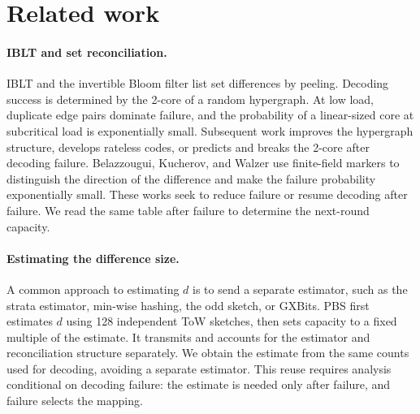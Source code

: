 \section{Related work}\label{sec:related}
\paragraph{IBLT and set reconciliation.} IBLT\cite{gm} and the invertible Bloom filter\cite{eppstein2011whatsdifference} list set differences by peeling. Decoding success is determined by the 2-core of a random hypergraph\cite{molloy,dw,dm}. At low load, duplicate edge pairs dominate failure\cite{gm,yw}, and the probability of a linear-sized core at subcritical load is exponentially small\cite{kim2008poisson,dn08}. Subsequent work improves the hypergraph structure\cite{lazaro2021irregular}, develops rateless codes\cite{yang2024rateless,lazaro2023ratecompatible}, or predicts and breaks the 2-core after decoding failure\cite{gadurek2026breaking}. Belazzougui, Kucherov, and Walzer\cite{belazzougui2024better} use finite-field markers to distinguish the direction of the difference and make the failure probability exponentially small. These works seek to reduce failure or resume decoding after failure. We read the same table after failure to determine the next-round capacity.

\paragraph{Estimating the difference size.} A common approach to estimating $d$ is to send a separate estimator, such as the strata estimator\cite{eppstein2011whatsdifference}, min-wise hashing\cite{broder2000minwise}, the odd sketch\cite{mitzenmacher2014odd}, or GXBits\cite{jia2024gxbits}. PBS\cite{gong2021pbs} first estimates $d$ using 128 independent ToW sketches, then sets capacity to a fixed multiple of the estimate. It transmits and accounts for the estimator and reconciliation structure separately. We obtain the estimate from the same counts used for decoding, avoiding a separate estimator. This reuse requires analysis conditional on decoding failure: the estimate is needed only after failure, and failure selects the mapping.

